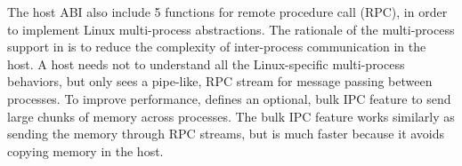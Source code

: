 


The host ABI also include 5 functions for 
remote procedure call (RPC),
in order to implement Linux multi-process abstractions.
The rationale of the multi-process support in \graphene{} is to reduce the complexity of inter-process communication in the host.
A host needs not to understand all the Linux-specific multi-process behaviors,
but only sees a pipe-like, RPC stream for message passing between processes.
To improve performance,
\thehostabi{} defines an optional, bulk IPC feature
to send large chunks of memory across processes.
The bulk IPC feature works similarly as sending the memory through RPC streams,
but is much faster because it avoids copying memory in the host.






